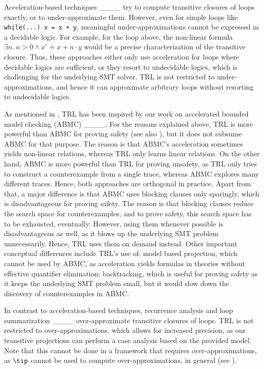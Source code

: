Acceleration-based techniques ____ try to compute transitive closures of loops exactly, or to under-ap\-prox\-i\-mate them.
%
However, even for simple loops like {\tt while(...) x = x + y}, meaningful under-ap\-prox\-i\-ma\-tions cannot be expressed in a decidable logic.
%
For example, for the loop above, the non-linear formula $\exists n.\ n > 0 \land x' \doteq x + n \cdot y$ would be a precise characterization of the transitive closure.
%
Thus, these approaches either only use acceleration for loops where decidable logics are sufficient, or they resort to undecidable logics, which is challenging for the underlying SMT solver.
%
TRL is not restricted to under-ap\-prox\-i\-ma\-tions, and hence it can ap\-prox\-i\-mate arbitrary loops without resorting to undecidable logics.

As mentioned in , TRL has been inspired by our work on accelerated bounded
model checking (ABMC) ____.
%
For the reasons explained above, TRL is more powerful than ABMC for proving safety (see also ), but it does not subsume ABMC for that purpose.
%
The reason is that ABMC's acceleration sometimes yields non-linear relations, whereas TRL only learns linear relations.
%
On the other hand, ABMC is more powerful than TRL for proving unsafety, as TRL only tries to construct a counterexample from a single trace, whereas ABMC explores many different traces.
%
Hence, both approaches are orthogonal in practice.
%
Apart from that, a major difference is that ABMC uses blocking clauses only sparingly, which is disadvantageous for proving safety.
%
The reason is that blocking clauses reduce the search space for counterexamples, and to prove safety, this search space has to be exhausted, eventually.
%
However, using them whenever possible is disadvantageous as well, as it blows up the underlying SMT problem unnecessarily.
%
Hence, TRL uses them on demand instead.
%
Other important conceptual differences include TRL's use of: model based projection, which
cannot be used by ABMC, as acceleration yields formulas in theories without effective
quantifier elimination; backtracking, which is useful for proving safety as it keeps the
underlying SMT problem small, but it would slow down the discovery of counterexamples in
ABMC.
  

In contrast to acceleration-based techniques, recurrence analysis and loop summarization ____ over-ap\-prox\-i\-mate transitive closures of loops.
%
TRL is not restricted to over-ap\-prox\-i\-ma\-tions, which allows for increased precision, as our transitive projections can perform a case analysis based on the provided model.
%
Note that this cannot be done in a framework that requires over-ap\-prox\-i\-ma\-tions, as $\tip$ cannot be used to compute over-approximations, in general (see ).


